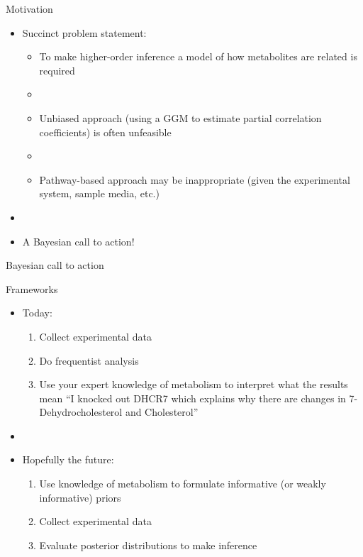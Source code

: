 \documentclass[xcolor=dvipsnames]{beamer}
\begin{document}
\begin{frame}{Motivation}
	\vspace{-15.5pt}
	\begin{itemize}
		\item Succinct problem statement: \pause
		\begin{itemize}
			\item To make higher-order inference a model of how metabolites are related is required \pause
			\item[]
			\item Unbiased approach (using a GGM to estimate partial correlation coefficients) is often unfeasible \pause
			\item[]
			\item Pathway-based approach may be inappropriate (given the experimental system, sample media, etc.) \pause
		\end{itemize}
		\item[]
		\item A Bayesian call to action!
	\end{itemize}
\end{frame}

\begin{frame}{Bayesian call to action}
	
	{\LARGE Frameworks}
	\begin{itemize}
		\item Today: \pause
		\begin{enumerate}[{1)}]
			\item Collect experimental data \pause
			\item Do frequentist analysis \pause
			\item Use your expert knowledge of metabolism to interpret what the results mean ``I knocked out DHCR7 which explains why there are changes in 7-Dehydrocholesterol and Cholesterol'' \pause
		\end{enumerate}
		\item[]
		\item Hopefully the future:
		\begin{enumerate}[{1)}]
			\item Use knowledge of metabolism to formulate informative (or weakly informative) priors \pause
			\item Collect experimental data \pause
			\item Evaluate posterior distributions to make inference
		\end{enumerate}
	\end{itemize}
\end{frame}
\end{document}
